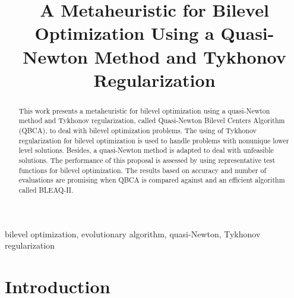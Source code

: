 \documentclass[conference]{IEEEtran}
\theoremstyle{definition}
\begin{document}
\title{A Metaheuristic for Bilevel Optimization Using a Quasi-Newton Method and Tykhonov Regularization}

\author{
\and
{}
}

\maketitle

\begin{abstract}
This work presents a metaheuristic for bilevel optimization using a quasi-Newton
method and Tykhonov regularization, called Quasi-Newton Bilevel Centers Algorithm
(QBCA), to deal with bilevel optimization problems. The using of Tykhonov
regularization for bilevel optimization is used to handle problems with nonunique
lower level solutions. Besides, a quasi-Newton method is adapted to deal with unfeasible
solutions. The performance of this proposal is assessed by using representative
test functions for bilevel optimization. The results based on accuracy and number
of evaluations are promising when QBCA is compared against and an efficient algorithm
called BLEAQ-II.
\end{abstract}

\begin{IEEEkeywords}
bilevel optimization, evolutionary algorithm, quasi-Newton, Tykhonov regularization
\end{IEEEkeywords}


\section{Introduction} %
\label{sec:introduction}

\end{document}
